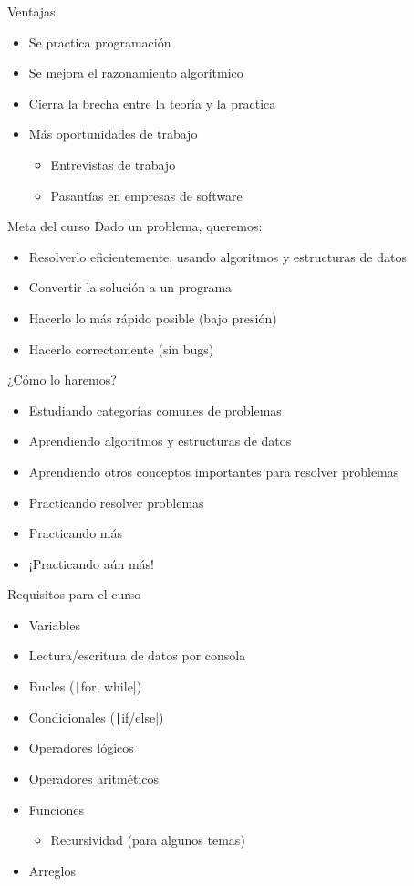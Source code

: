 \documentclass[10pt]{beamer}
\newcommand{\bi}{\begin{itemize}}
\newcommand{\ei}{\end{itemize}}
\begin{document}
\begin{frame}{Ventajas}
    \bi
        \item Se practica programación
        \item Se mejora el razonamiento algorítmico
        \item Cierra la brecha entre la teoría y la practica
        \item Más oportunidades de trabajo
        \bi
            \item Entrevistas de trabajo
            \item Pasantías en empresas de software
        \ei
    \ei
\end{frame}

\begin{frame}{Meta del curso}
    Dado un problema, queremos:
    \bi
        \item Resolverlo eficientemente, usando algoritmos y estructuras de datos
        \item Convertir la solución a un programa
        \item Hacerlo lo más rápido posible (bajo presión)
        \item Hacerlo correctamente (sin bugs)
    \ei
\end{frame}

\begin{frame}{¿Cómo lo haremos?}
    \bi
        \item Estudiando categorías comunes de problemas
        \item Aprendiendo algoritmos y estructuras de datos
        \item Aprendiendo otros conceptos importantes para resolver problemas
        \item Practicando resolver problemas
        \item Practicando más
        \item ¡Practicando aún más!
    \ei
\end{frame}

\begin{frame}{Requisitos para el curso}
    \bi
        \item Variables
        \item Lectura/escritura de datos por consola
        \item Bucles (\texttt|for, while|)
        \item Condicionales (\texttt|if/else|)
        \item Operadores lógicos
        \item Operadores aritméticos
        \item Funciones
        \bi 
            \item Recursividad (para algunos temas)
        \ei
        \item Arreglos
    \ei
\end{frame}
\end{document}
